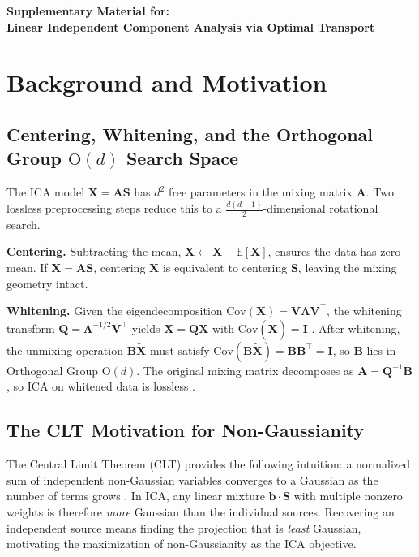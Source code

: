 \documentclass[accepted]{tpm2026} %
\begin{document}
\newpage
\onecolumn
\appendix

\begin{center}
    \Large\textbf{Supplementary Material for:}\\
    \large\textbf{Linear Independent Component Analysis via Optimal Transport}
\end{center}

\section{Background and Motivation}
\label{app:info_geometry}

\subsection{Centering, Whitening, and the Orthogonal Group $\mathrm{O}(d)$ Search Space}

The ICA model $\mathbf{X} = \mathbf{A}\mathbf{S}$ has $d^2$ free parameters in the mixing matrix $\mathbf{A}$.
Two lossless preprocessing steps reduce this to a $\tfrac{d(d-1)}{2}$-dimensional rotational search.

\textbf{Centering.} Subtracting the mean, $\mathbf{X} \gets \mathbf{X} - \mathbb{E}[\mathbf{X}]$, ensures the data has zero mean.
If $\mathbf{X} = \mathbf{A}\mathbf{S}$, centering $\mathbf{X}$ is equivalent to centering $\mathbf{S}$, leaving the mixing geometry intact.

\textbf{Whitening.} Given the eigendecomposition $\mathrm{Cov}(\mathbf{X}) = \mathbf{V}\boldsymbol{\Lambda}\mathbf{V}^\top$, the whitening transform $\mathbf{Q} = \boldsymbol{\Lambda}^{-1/2}\mathbf{V}^\top$ yields $\widetilde{\mathbf{X}} = \mathbf{Q}\mathbf{X}$ with $\mathrm{Cov}(\widetilde{\mathbf{X}}) = \mathbf{I}$ \citep{hyvarinen2001}.
After whitening, the unmixing operation $\mathbf{B}\widetilde{\mathbf{X}}$ must satisfy $\mathrm{Cov}(\mathbf{B}\widetilde{\mathbf{X}}) = \mathbf{B}\mathbf{B}^\top = \mathbf{I}$, so $\mathbf{B}$ lies in Orthogonal Group $\mathrm{O}(d)$.
The original mixing matrix decomposes as $\mathbf{A} = \mathbf{Q}^{-1}\mathbf{B}$, so ICA on whitened data is lossless \citep{cardoso2022}.

\subsection{The CLT Motivation for Non-Gaussianity}

The Central Limit Theorem (CLT) provides the following intuition: a normalized sum of independent non-Gaussian variables converges to a Gaussian as the number of terms grows \citep{hyvarinen2001}. In ICA, any linear mixture $\mathbf{b}\cdot\mathbf{S}$ with multiple nonzero weights is therefore \emph{more} Gaussian than the individual sources. Recovering an independent source means finding the projection that is \emph{least} Gaussian, motivating the maximization of non-Gaussianity as the ICA objective.
\end{document}
